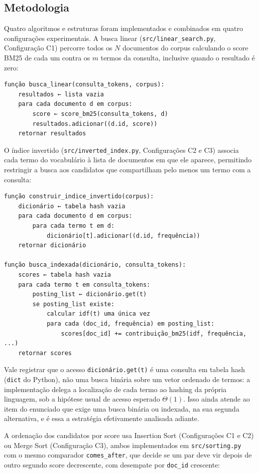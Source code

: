 \documentclass[12pt, a4paper]{article}
\begin{document}
\subsection{Metodologia}

Quatro algoritmos e estruturas foram implementados e combinados em quatro configurações experimentais. A busca linear (\texttt{src/linear\_search.py}, Configuração C1) percorre todos os $N$ documentos do corpus calculando o score BM25 de cada um contra os $m$ termos da consulta, inclusive quando o resultado é zero:

\begin{verbatim}
função busca_linear(consulta_tokens, corpus):
    resultados ← lista vazia
    para cada documento d em corpus:
        score ← score_bm25(consulta_tokens, d)
        resultados.adicionar((d.id, score))
    retornar resultados
\end{verbatim}

O índice invertido (\texttt{src/inverted\_index.py}, Configurações C2 e C3) associa cada termo do vocabulário à lista de documentos em que ele aparece, permitindo restringir a busca aos candidatos que compartilham pelo menos um termo com a consulta:

\begin{verbatim}
função construir_indice_invertido(corpus):
    dicionário ← tabela hash vazia
    para cada documento d em corpus:
        para cada termo t em d:
            dicionário[t].adicionar((d.id, frequência))
    retornar dicionário

função busca_indexada(dicionário, consulta_tokens):
    scores ← tabela hash vazia
    para cada termo t em consulta_tokens:
        posting_list ← dicionário.get(t)
        se posting_list existe:
            calcular idf(t) uma única vez
            para cada (doc_id, frequência) em posting_list:
                scores[doc_id] += contribuição_bm25(idf, frequência, ...)
    retornar scores
\end{verbatim}

Vale registrar que o acesso \texttt{dicionário.get(t)} é uma consulta em tabela hash (\texttt{dict} do Python), não uma busca binária sobre um vetor ordenado de termos: a implementação delega a localização de cada termo ao hashing da própria linguagem, sob a hipótese usual de acesso esperado $\Theta(1)$. Isso ainda atende ao item do enunciado que exige uma busca binária ou indexada, na sua segunda alternativa, e é essa a estratégia efetivamente analisada adiante.

A ordenação dos candidatos por score usa Insertion Sort (Configurações C1 e C2) ou Merge Sort (Configuração C3), ambos implementados em \texttt{src/sorting.py} com o mesmo comparador \texttt{comes\_after}, que decide se um par deve vir depois de outro segundo score decrescente, com desempate por \texttt{doc\_id} crescente:
\end{document}
